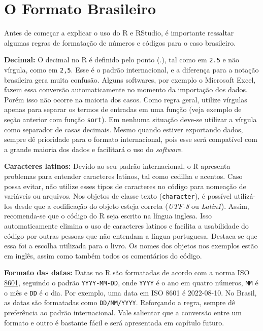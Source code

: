 \documentclass[
  11pt,
]{book}
\begin{document}
\hypertarget{o-formato-brasileiro}{%
\section{O Formato Brasileiro}\label{o-formato-brasileiro}}

Antes de começar a explicar o uso do R e RStudio, é importante ressaltar algumas regras de formatação de números e códigos para o caso brasileiro.

\textbf{Decimal:} O decimal no R é definido pelo ponto (.), tal como em \texttt{2.5} e não vírgula, como em \texttt{2,5}. Esse é o padrão internacional, e a diferença para a notação brasileira gera muita confusão. Alguns softwares, por exemplo o Microsoft Excel, fazem essa conversão automaticamente no momento da importação dos dados. Porém isso não ocorre na maioria dos casos. Como regra geral, utilize vírgulas apenas para separar os termos de entradas em uma função (veja exemplo de seção anterior com função \texttt{sort}). Em nenhuma situação deve-se utilizar a vírgula como separador de casas decimais. Mesmo quando estiver exportando dados, sempre dê prioridade para o formato internacional, pois esse será compatível com a grande maioria dos dados e facilitará o uso do \emph{software}.

\textbf{Caracteres latinos:} Devido ao seu padrão internacional, o R apresenta problemas para entender caracteres latinos, tal como cedilha e acentos. Caso possa evitar, não utilize esses tipos de caracteres no código para nomeação de variáveis ou arquivos. Nos objetos de classe texto (\texttt{character}), é possível utilizá-los desde que a codificação do objeto esteja correta (\emph{UTF-8} ou \emph{Latin1}). Assim, recomenda-se que o código do R seja escrito na língua inglesa. Isso automaticamente elimina o uso de caracteres latinos e facilita a usabilidade do código por outras pessoas que não entendam a língua portuguesa. Destaca-se que essa foi a escolha utilizada para o livro. Os nomes dos objetos nos exemplos estão em inglês, assim como também todos os comentários do código. 

\textbf{Formato das datas:} Datas no R são formatadas de acordo com a norma \href{https://www.iso.org/iso-8601-date-and-time-format.html}{ISO 8601}, seguindo o padrão \texttt{YYYY-MM-DD}, onde \texttt{YYYY} é o ano em quatro números, \texttt{MM} é o mês e \texttt{DD} é o dia. Por exemplo, uma data em ISO 8601 é 2022-08-10. No Brasil, as datas são formatadas como \texttt{DD/MM/YYYY}. Reforçando a regra, sempre dê preferência ao padrão internacional. Vale salientar que a conversão entre um formato e outro é bastante fácil e será apresentada em capítulo futuro.
\end{document}

